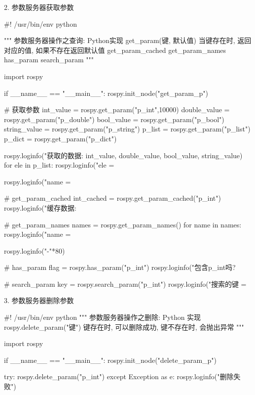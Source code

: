 \documentclass[openany, fontset=windowsold]{ctexbook}
\theoremstyle{kaiti}
\theoremstyle{normal}
\begin{document}
2. 参数服务器获取参数

\begin{python}
  #! /usr/bin/env python

  """
      参数服务器操作之查询: Python实现
          get_param(键, 默认值)
              当键存在时, 返回对应的值, 如果不存在返回默认值
          get_param_cached
          get_param_names
          has_param
          search_param
  """

  import rospy

  if __name__ == "__main__":
      rospy.init_node("get_param_p")

      # 获取参数
      int_value = rospy.get_param("p_int",10000)
      double_value = rospy.get_param("p_double")
      bool_value = rospy.get_param("p_bool")
      string_value = rospy.get_param("p_string")
      p_list = rospy.get_param("p_list")
      p_dict = rospy.get_param("p_dict")

      rospy.loginfo("获取的数据:%
                  int_value,
                  double_value,
                  bool_value,
                  string_value)
      for ele in p_list:
          rospy.loginfo("ele = %

      rospy.loginfo("name = %

      # get_param_cached
      int_cached = rospy.get_param_cached("p_int")
      rospy.loginfo("缓存数据:%

      # get_param_names
      names = rospy.get_param_names()
      for name in names:
          rospy.loginfo("name = %

      rospy.loginfo("-"*80)

      # has_param
      flag = rospy.has_param("p_int")
      rospy.loginfo("包含p_int吗? %

      # search_param
      key = rospy.search_param("p_int")
      rospy.loginfo("搜索的键 = %
\end{python}

3. 参数服务器删除参数

\begin{python}
  #! /usr/bin/env python
  """
      参数服务器操作之删除: Python 实现
      rospy.delete_param("键")
      键存在时, 可以删除成功, 键不存在时, 会抛出异常
  """

  import rospy

  if __name__ == "__main__":
      rospy.init_node("delete_param_p")

      try:
          rospy.delete_param("p_int")
      except Exception as e:
          rospy.loginfo("删除失败")
\end{python}
\end{document}

